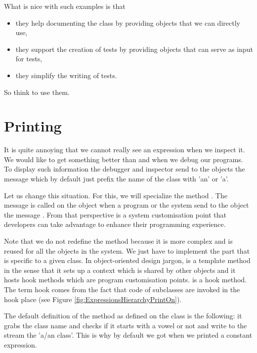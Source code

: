 \documentclass[10pt,twoside,english]{_support/latex/sbabook/sbabook}
\begin{document}
What is nice with such examples is that 

\begin{itemize}
\item they help documenting the class by providing objects that we can directly use,
\item they support the creation of tests by providing objects that can serve as input for tests,
\item they simplify the writing of tests. 
\end{itemize}

So think to use them. 
\section{Printing}
It is quite annoying that we cannot really see an expression when we inspect it. We would like to get something better than  and  when we debug our programs.
To display such information the debugger and inspector send to the objects the message  which by default just prefix the name of the class with 'an' or 'a'. 

Let us change this situation. For this, we will specialize the method . The message  is called on the object when a program or the system send to the object the message . From that perspective  is a system customisation point that developers can take advantage to enhance their programming experience.

Note that we do not redefine the method  because it is more complex and  is reused for all the objects in the system. We just have to implement the part that is specific to a given class. In object-oriented design jargon,  is a template method in the sense that it sets up a context which is shared by other objects and it hosts hook methods which are program customisation points.  is a hook method. The term hook comes from the fact that code of subclasses are invoked in the hook place (see Figure \ref{fig:ExpressionsHierarchyPrintOn}).

The default definition of the method  as defined on the class  is the following: it grabs the class name and checks if it starts with a vowel or not and write to the stream the 'a/an class'. This is why by default we got  when we printed a constant expression. 
\end{document}
